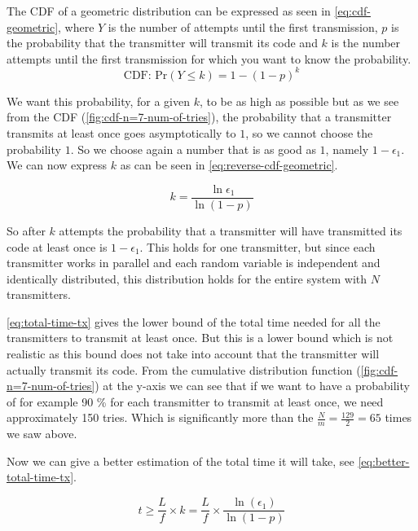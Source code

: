 		The CDF of a geometric distribution can be expressed as seen in \autoref{eq:cdf-geometric}, where $Y$ is the number of attempts until the first transmission, $p$ is the probability that the transmitter will transmit its code and $k$ is the number attempts until the first transmission for which you want to know the probability.
		\begin{equation}
			\label{eq:cdf-geometric}
			\text{CDF:  Pr}(Y \le k) = 1 - (1 - p)^k
		\end{equation}
		
		We want this probability, for a given $k$, to be as high as possible but as we see from the CDF (\autoref{fig:cdf-n=7-num-of-tries}), the probability that a transmitter transmits at least once goes asymptotically to $1$, so we cannot choose the probability $1$.
		So we choose again a number that is as good as $1$, namely $1 - \epsilon_1$.
		We can now express $k$ as can be seen in \autoref{eq:reverse-cdf-geometric}.

		\begin{equation}
			\label{eq:reverse-cdf-geometric}
			k = \frac{\ln\epsilon_1}{\ln(1 - p)}
		\end{equation}

		So after $k$ attempts the probability that a transmitter will have transmitted its code at least once is $1 - \epsilon_1$.
		This holds for one transmitter, but since each transmitter works in parallel and each random variable is independent and identically distributed, this distribution holds for the entire system with $N$ transmitters.

		\autoref{eq:total-time-tx} gives the lower bound of the total time needed for all the transmitters to transmit at least once.
		But this is a lower bound which is not realistic as this bound does not take into account that the transmitter will actually transmit its code.
		From the cumulative distribution function (\autoref{fig:cdf-n=7-num-of-tries}) at the y-axis we can see that if we want to have a probability of for example 90 \% for each transmitter to transmit at least once, we need approximately 150 tries. 
		Which is significantly more than the $\frac{N}{m} = \frac{129}{2} = 65$ times we saw above.

		Now we can give a better estimation of the total time it will take, see \autoref{eq:better-total-time-tx}.

		\begin{equation}
			\label{eq:better-total-time-tx}
			t \ge \frac{L}{f} \times k = \frac{L}{f} \times \frac{\ln(\epsilon_1)}{\ln(1 - p)}
		\end{equation}



		

		

		

		
		







